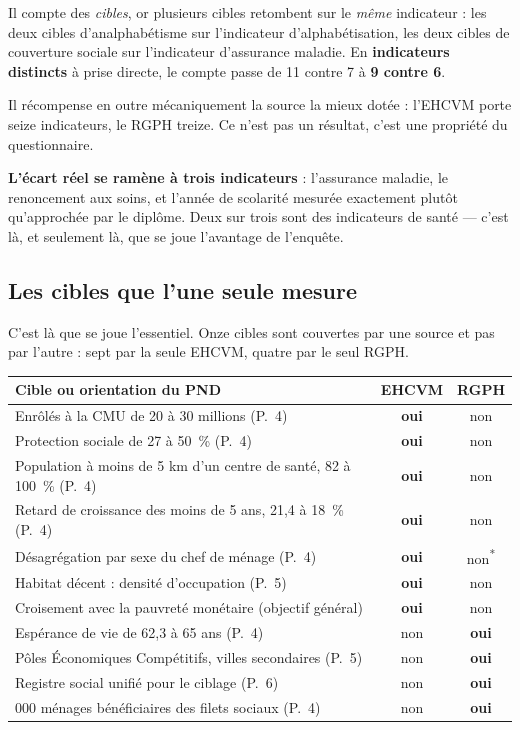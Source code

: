 \documentclass[11pt,a4paper]{article}
\begin{document}
\begin{attention}
Il compte des \emph{cibles}, or plusieurs cibles retombent sur le \emph{même} indicateur : les deux
cibles d'analphabétisme sur l'indicateur d'alphabétisation, les deux cibles de couverture sociale
sur l'indicateur d'assurance maladie. En \textbf{indicateurs distincts} à prise directe, le compte
passe de 11 contre 7 à \textbf{9 contre 6}.

Il récompense en outre mécaniquement la source la mieux dotée : l'EHCVM porte seize indicateurs, le
RGPH treize. Ce n'est pas un résultat, c'est une propriété du questionnaire.

\textbf{L'écart réel se ramène à trois indicateurs} : l'assurance maladie, le renoncement aux soins,
et l'année de scolarité mesurée exactement plutôt qu'approchée par le diplôme. Deux sur trois sont
des indicateurs de santé --- c'est là, et seulement là, que se joue l'avantage de l'enquête.
\end{attention}

\subsection{Les cibles que l'une seule mesure}

C'est là que se joue l'essentiel. Onze cibles sont couvertes par une source et pas par
l'autre : sept par la seule EHCVM, quatre par le seul RGPH.

\begin{center}
\small
\begin{tabular}{@{}>{\RaggedRight}p{7.4cm}cc@{}}
\toprule
\textbf{Cible ou orientation du PND} & \textbf{EHCVM} & \textbf{RGPH} \\
\midrule
Enrôlés à la CMU de 20 à 30 millions (P.~4) & \textbf{oui} & non \\
Protection sociale de 27 à 50~\% (P.~4) & \textbf{oui} & non \\
Population à moins de 5 km d'un centre de santé, 82 à 100~\% (P.~4) & \textbf{oui} & non \\
Retard de croissance des moins de 5 ans, 21,4 à 18~\% (P.~4) & \textbf{oui} & non \\
Désagrégation par sexe du chef de ménage (P.~4) & \textbf{oui} & non\textsuperscript{*} \\
Habitat décent : densité d'occupation (P.~5) & \textbf{oui} & non \\
Croisement avec la pauvreté monétaire (objectif général) & \textbf{oui} & non \\
\addlinespace
Espérance de vie de 62,3 à 65 ans (P.~4) & non & \textbf{oui} \\
Pôles Économiques Compétitifs, villes secondaires (P.~5) & non & \textbf{oui} \\
Registre social unifié pour le ciblage (P.~6) & non & \textbf{oui} \\
827 000 ménages bénéficiaires des filets sociaux (P.~4) & non & \textbf{oui} \\
\bottomrule
\end{tabular}
\end{center}
\end{document}
